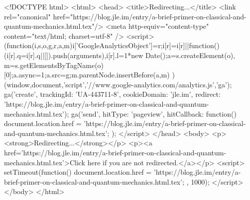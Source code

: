 <!DOCTYPE html>
<html>
<head>
<title>Redirecting...</title>
<link rel="canonical" href="https://blog.jle.im/entry/a-brief-primer-on-classical-and-quantum-mechanics.html.tex"/>
<meta http-equiv="content-type" content="text/html; charset=utf-8" />
<script>
(function(i,s,o,g,r,a,m){i['GoogleAnalyticsObject']=r;i[r]=i[r]||function(){
(i[r].q=i[r].q||[]).push(arguments)},i[r].l=1*new Date();a=s.createElement(o),
m=s.getElementsByTagName(o)[0];a.async=1;a.src=g;m.parentNode.insertBefore(a,m)
})(window,document,'script','//www.google-analytics.com/analytics.js','ga');
ga('create', { trackingId: 'UA-443711-8', cookieDomain: 'jle.im', redirect: 'https://blog.jle.im/entry/a-brief-primer-on-classical-and-quantum-mechanics.html.tex'});
ga('send', { hitType: 'pageview', hitCallback: function() { document.location.href = 'https://blog.jle.im/entry/a-brief-primer-on-classical-and-quantum-mechanics.html.tex'; } });
</script>
</head>
<body>
  <p><strong>Redirecting...</strong></p>
  <p><a href='https://blog.jle.im/entry/a-brief-primer-on-classical-and-quantum-mechanics.html.tex'>Click here if you are not redirected.</a></p>
  <script>
    setTimeout(function() { document.location.href = 'https://blog.jle.im/entry/a-brief-primer-on-classical-and-quantum-mechanics.html.tex'; }, 1000);
  </script>
</body>
</html>
